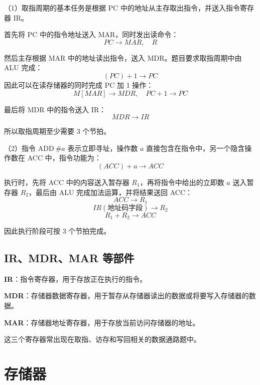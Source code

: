 \begin{analysisenv}
（1）取指周期的基本任务是根据 PC 中的地址从主存取出指令，并送入指令寄存器 IR。

首先将 PC 中的指令地址送入 MAR，同时发出读命令：
\[
PC \rightarrow MAR,\quad R
\]

然后主存根据 MAR 中的地址读出指令，送入 MDR。题目要求取指周期中由 ALU 完成：
\[
(PC)+1 \rightarrow PC
\]
因此可以在读存储器的同时完成 PC 加 1 操作：
\[
M[MAR] \rightarrow MDR,\quad PC+1 \rightarrow PC
\]

最后将 MDR 中的指令送入 IR：
\[
MDR \rightarrow IR
\]

所以取指周期至少需要 3 个节拍。

（2）指令 \(\mathrm{ADD}\ \#a\) 表示立即寻址，操作数 \(a\) 直接包含在指令中，另一个隐含操作数在 ACC 中，指令功能为：
\[
(ACC) + a \rightarrow ACC
\]

执行时，先将 ACC 中的内容送入暂存器 \(R_1\)，再将指令中给出的立即数 \(a\) 送入暂存器 \(R_2\)，最后由 ALU 完成加法运算，并将结果送回 ACC：
\[
ACC \rightarrow R_1
\]
\[
IR(\text{地址码字段}) \rightarrow R_2
\]
\[
R_1 + R_2 \rightarrow ACC
\]

因此执行阶段可按 3 个节拍完成。
\end{analysisenv}








\subsection{IR、MDR、MAR 等部件}

\begin{knowledge}
\textbf{IR}：指令寄存器，用于存放正在执行的指令。

\textbf{MDR}：存储器数据寄存器，用于暂存从存储器读出的数据或将要写入存储器的数据。

\textbf{MAR}：存储器地址寄存器，用于存放当前访问存储器的地址。

这三个寄存器常出现在取指、访存和写回相关的数据通路题中。
\end{knowledge}



\newpage




\section{存储器}

